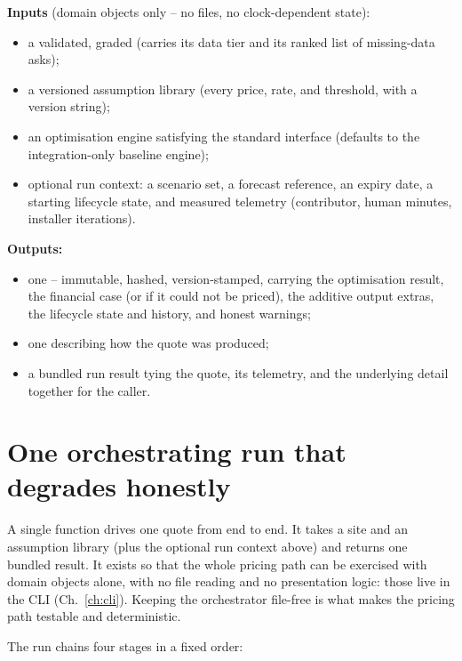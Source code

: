 \begin{contract}
\textbf{Inputs} (domain objects only -- no files, no clock-dependent state):
\begin{itemize}
  \item a validated, graded  (carries its data tier and its ranked list of missing-data asks);
  \item a versioned assumption library (every price, rate, and threshold, with a version string);
  \item an optimisation engine satisfying the standard interface (defaults to the integration-only baseline engine);
  \item optional run context: a scenario set, a forecast reference, an expiry date, a starting lifecycle state, and measured telemetry (contributor, human minutes, installer iterations).
\end{itemize}
\textbf{Outputs:}
\begin{itemize}
  \item one  -- immutable, hashed, version-stamped, carrying the optimisation result, the financial case (or  if it could not be priced), the additive output extras, the lifecycle state and history, and honest warnings;
  \item one  describing how the quote was produced;
  \item a bundled run result tying the quote, its telemetry, and the underlying detail together for the caller.
\end{itemize}
\end{contract}

\section{One orchestrating run that degrades honestly}

A single function drives one quote from end to end. It takes a site and an assumption library (plus the optional run context above) and returns one bundled result. It exists so that the whole pricing path can be exercised with domain objects alone, with no file reading and no presentation logic: those live in the CLI (Ch.~\ref{ch:cli}). Keeping the orchestrator file-free is what makes the pricing path testable and deterministic.

The run chains four stages in a fixed order:

